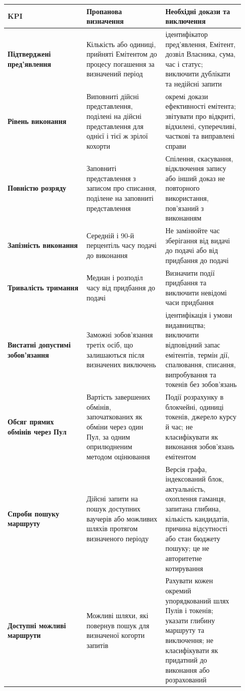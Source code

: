 \documentclass[11pt]{article}
\begin{document}
\begin{longtable}{P{0.31\linewidth} P{0.31\linewidth} P{0.31\linewidth}}
\toprule
KPI & Пропанова визначення & Необхідні докази та виключення \\
\midrule
\endhead
\textbf{Підтверджені пред'явлення} & Кількість або одиниці, прийняті Емітентом до процесу погашення за визначений період & ідентифікатор пред'явлення, Емітент, дозвіл Власника, сума, час і статус; виключити дублікати та недійсні запити \\
\textbf{Рівень виконання} & Виповниті дійсні представлення, поділені на дійсні представлення для однієї і тієї ж зрілої кохорти & окремі докази ефективності емітента; звітувати про відкриті, відхилені, суперечливі, часткові та виправлені справи \\
\textbf{Повністю розряду} & Заповниті представлення з записом про списання, поділене на заповниті представлення & Спілення, скасування, відключення запису або інший доказ не повторного використання, пов'язаний з виконанням \\
\textbf{Запізність виконання} & Середній і 90-й перцентіль часу подачі до виконання & Не замінюйте час зберігання від видачі до подачі або від придбання до подачі \\
\textbf{Тривалість тримання} & Медиан і розподіл часу від придбання до подачі & Визначити події придбання та виключити невідомі часи придбання \\
\textbf{Вистатні допустимі зобов'язання} & Заможні зобов'язання третіх осіб, що залишаються після визначених виключень & ідентифікація і умови видавництва; виключити відповідний запас емітентів, термін дії, спалювання, списання, випробування та токенів без зобов'язань \\
\textbf{Обсяг прямих обмінів через Пул} & Вартість завершених обмінів, започаткованих як обміни через один Пул, за одним оприлюдненим методом оцінювання & Події розрахунку в блокчейні, одиниці токенів, джерело курсу й час; не класифікувати як виконання зобов'язань емітентом \\
\textbf{Спроби пошуку маршруту} & Дійсні запити на пошук доступних ваучерів або можливих шляхів протягом визначеного періоду & Версія графа, індексований блок, актуальність, охоплення гаманця, запитана глибина, кількість кандидатів, причина відсутності або стан бюджету пошуку; це не авторитетне котирування \\
\textbf{Доступні можливі маршрути} & Можливі шляхи, які повернув пошук для визначеної когорти запитів & Рахувати кожен окремий упорядкований шлях Пулів і токенів; указати глибину маршруту та виключення; не класифікувати як придатний до виконання або розрахований \\

\end{longtable}
\end{document}
